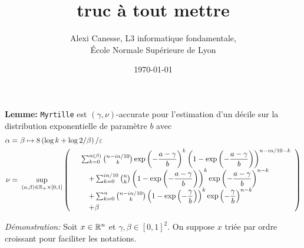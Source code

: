 
\usepackage{tkz-base}
\usepackage{algorithm}
\usepackage{algorithmic}
\setlength\parindent{0pt}





\title{truc à tout mettre}           
\author{Alexi Canesse, L3 informatique fondamentale,\\École Normale Supérieure de Lyon}
\date{\today}          

\sloppy                  

\pgfplotsset{compat=1.16}







\textbf{Lemme: } \texttt{Myrtille} est \((\gamma, \nu)\)-accurate pour l'estimation d'un décile sur la distribution exponentielle de paramètre \(b\) avec
\begin{align*}
    \alpha =&\ \beta \mapsto 8\left( \log k + \log 2/\beta \right)/\varepsilon\\
    \nu = &\ \sup_{(a,\beta) \in \R_+ \times [0,1]} \left( 
        \begin{array}[]{rl}
            &\sum_{k = 0}^{\alpha(\beta)} \binom{n - in/10}{k}\exp\left( -\dfrac{a-\gamma}{b} \right)^k \left( 1 - \exp\left( -\dfrac{a-\gamma}{b} \right) \right)^{n - in/10 -k} \\
            & \quad  + \sum_{k = 0}^{in/10} \binom{n}{k} \left( 1 - \exp\left( -\dfrac{a-\gamma}{b} \right) \right)^k \exp\left( -\dfrac{a-\gamma}{b} \right)^{n-k} \\
            & \quad + \sum_{k = 0}^{\alpha} \binom{n - in/10}{k} \left( 1 - \exp\left( -\dfrac{\gamma}{b} \right) \right)^k \exp\left( -\dfrac{\gamma}{b} \right)^{n-k}\\
            & \quad + \beta 
        \end{array}
    \right)
\end{align*}

\textit{Démonstration:} Soit \(x \in \mathbb{R}^n\) et \(\gamma, \beta \in [0,1]^2\). On suppose \(x\) triée par ordre croissant pour faciliter les notations.\\

